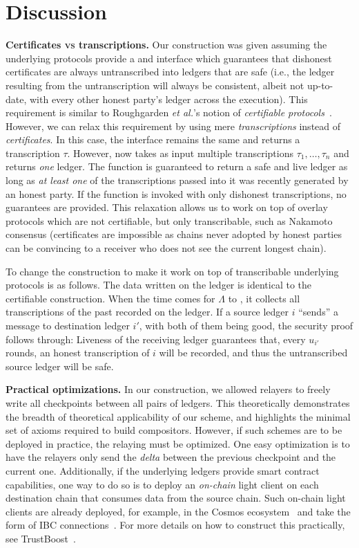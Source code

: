 \section{Discussion}

\noindent
\textbf{Certificates \textsc{vs} transcriptions.}
Our \rollerblade construction was given assuming the underlying protocols
provide a \transcribe and \untranscribe interface which guarantees that
dishonest certificates are always untranscribed into ledgers that are
safe (i.e., the ledger resulting from the untranscription will always
be consistent, albeit not up-to-date, with every other honest party's
ledger across the execution). This requirement is similar to Roughgarden
\emph{et al.}'s notion of \emph{certifiable protocols}~\cite{certifiable-roughgarden}.
However, we can relax this requirement by using mere \emph{transcriptions}
instead of \emph{certificates}. In this case, the \transcribe interface
remains the same and returns a transcription $\tau$. However, \untranscribe
now takes as input multiple transcriptions $\tau_1, \ldots, \tau_n$ and
returns \emph{one} ledger. The \untranscribe function is guaranteed to return
a safe and live ledger as long as \emph{at least one} of the transcriptions
passed into it was recently generated by an honest party. If the \untranscribe
function is invoked with only dishonest transcriptions, no guarantees are
provided. This relaxation allows us to work on top of overlay protocols
which are not certifiable, but only transcribable, such as Nakamoto consensus
(certificates are impossible as chains never adopted by honest parties
can be convincing to a receiver who does not see the current longest chain).

To change the \rollerblade construction to make it work on top of transcribable
underlying protocols is as follows. The data written on the ledger is identical to the
certifiable \rollerblade construction. When the time comes for $\Lambda$ to
\untranscribe, it collects all transcriptions of the past recorded on the ledger.
If a source ledger $i$ ``sends'' a message to destination ledger $i'$, with both
of them being good, the security proof follows through:
Liveness of the receiving ledger guarantees that, every $u_{i'}$ rounds, an honest
transcription of $i$ will be recorded, and thus the untranscribed source ledger
will be safe.

\noindent
\textbf{Practical optimizations.}
In our \rollerblade construction, we allowed relayers to freely write all
checkpoints between all pairs of ledgers. This theoretically demonstrates
the breadth of theoretical applicability of our scheme, and highlights
the minimal set of axioms required to build compositors.
However, if such schemes are to be deployed in practice, the relaying
must be optimized. One easy optimization is to have the relayers only
send the \emph{delta} between the previous checkpoint and the current one.
Additionally, if the underlying ledgers provide smart contract
capabilities, one way to do so is to deploy an \emph{on-chain} light
client on each destination chain that consumes data from the source
chain. Such on-chain light clients are already deployed, for example,
in the Cosmos ecosystem~\cite{cosmos} and take the form of IBC
connections~\cite{ibc}. For more details on how to construct this
practically, see TrustBoost~\cite{trustboost}.
